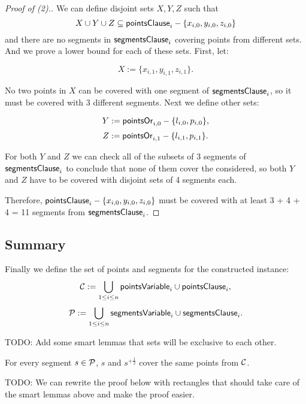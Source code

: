 \begin{proof}[Proof of (2).]

We can define disjoint sets $X, Y, Z$ such that
$$X \cup Y \cup Z \subseteq \mathsf{pointsClause}_{i} - \{x_{i, 0}, y_{i, 0}, z_{i, 0}\}$$
and there are no segments in $\mathsf{segmentsClause}_i$ covering points from different sets.
And we prove a lower bound for each of these sets.
First, let:

$$X := \{x_{i, 1}, y_{i, 1}, z_{i, 1}\}.$$

No two points in $X$ can be covered with one segment
of $\mathsf{segmentsClause}_i$, so it must be covered with 3 different segments.
Next we define other sets:

$$Y := \mathsf{pointsOr}_{i,0} - \{l_{i, 0}, p_{i, 0}\},$$
$$Z := \mathsf{pointsOr}_{i,1} - \{l_{i, 1}, p_{i, 1}\}.$$


For both $Y$ and $Z$ we can check all of the subsets of 3 segments
of $\mathsf{segmentsClause}_i$
to conclude that none of them cover the considered,
so both $Y$ and $Z$ have to be covered with 
disjoint sets of 4 segments each.

Therefore, $\mathsf{pointsClause}_{i} - \{x_{i, 0}, y_{i, 0}, z_{i, 0}\}$
must be covered with at least 3 + 4 + 4 = 11 segments from $\mathsf{segmentsClause}_i$.
\end{proof}

\subsection{Summary}



Finally we define the set of points and segments for the constructed instance:
$$\mathcal{C} := \bigcup_{1 \le i \le n} \mathsf{pointsVariable}_{i} \cup \mathsf{pointsClause}_{i},$$
$$\mathcal{P} := \bigcup_{1 \le i \le n} \mathsf{segmentsVariable}_{i} \cup \mathsf{segmentsClause}_i.$$


TODO: Add some smart lemmas that sets will be exclusive to each other.

\begin{lemma}
\label{lemma:exntension_robust}
For every segment $s \in \mathcal{P}$,
$s$ and $s^{+\frac{1}{2}}$ cover the same points from $\mathcal{C}$.
\end{lemma}

TODO: We can rewrite the proof below with rectangles
that should take care of the smart lemmas above and make the proof easier.

